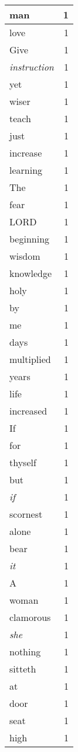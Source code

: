 \begin{center}
\begin{longtable}{l|r}
man & 1\\ \hline 
love & 1\\ \hline 
Give & 1\\ \hline 
\emph{instruction} & 1\\ \hline 
yet & 1\\ \hline 
wiser & 1\\ \hline 
teach & 1\\ \hline 
just & 1\\ \hline 
increase & 1\\ \hline 
learning & 1\\ \hline 
The & 1\\ \hline 
fear & 1\\ \hline 
LORD & 1\\ \hline 
beginning & 1\\ \hline 
wisdom & 1\\ \hline 
knowledge & 1\\ \hline 
holy & 1\\ \hline 
by & 1\\ \hline 
me & 1\\ \hline 
days & 1\\ \hline 
multiplied & 1\\ \hline 
years & 1\\ \hline 
life & 1\\ \hline 
increased & 1\\ \hline 
If & 1\\ \hline 
for & 1\\ \hline 
thyself & 1\\ \hline 
but & 1\\ \hline 
\emph{if} & 1\\ \hline 
scornest & 1\\ \hline 
alone & 1\\ \hline 
bear & 1\\ \hline 
\emph{it} & 1\\ \hline 
A & 1\\ \hline 
woman & 1\\ \hline 
clamorous & 1\\ \hline 
\emph{she} & 1\\ \hline 
nothing & 1\\ \hline 
sitteth & 1\\ \hline 
at & 1\\ \hline 
door & 1\\ \hline 
seat & 1\\ \hline 
high & 1\\ \hline 

\end{longtable}
\end{center}
